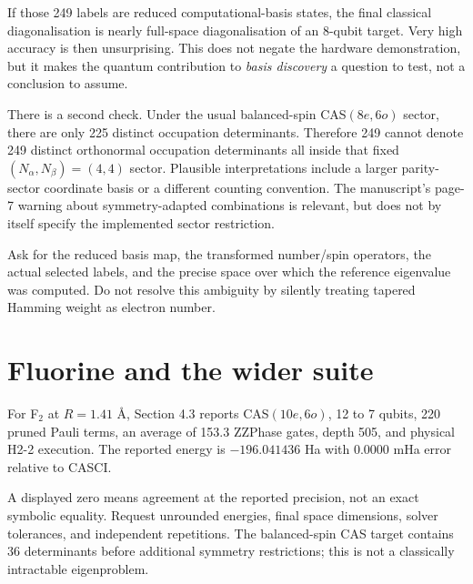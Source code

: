 \documentclass[11pt,a4paper,oneside]{report}
\begin{document}
\begin{idea}
If those 249 labels are reduced computational-basis states, the final classical diagonalisation is nearly full-space diagonalisation of an 8-qubit target. Very high accuracy is then unsurprising. This does not negate the hardware demonstration, but it makes the quantum contribution to \emph{basis discovery} a question to test, not a conclusion to assume.
\end{idea}

There is a second check. Under the usual balanced-spin CAS$(8e,6o)$ sector, there are only 225 distinct occupation determinants. Therefore 249 cannot denote 249 distinct orthonormal occupation determinants all inside that fixed $(N_\alpha,N_\beta)=(4,4)$ sector. Plausible interpretations include a larger parity-sector coordinate basis or a different counting convention. The manuscript's page-7 warning about symmetry-adapted combinations is relevant, but does not by itself specify the implemented sector restriction.

Ask for the reduced basis map, the transformed number/spin operators, the actual selected labels, and the precise space over which the reference eigenvalue was computed. Do not resolve this ambiguity by silently treating tapered Hamming weight as electron number.

\section{Fluorine and the wider suite}
For F$_2$ at $R=1.41$ \AA, Section 4.3 reports CAS$(10e,6o)$, 12 to 7 qubits, 220 pruned Pauli terms, an average of 153.3 ZZPhase gates, depth 505, and physical H2-2 execution. The reported energy is $-196.041436$ Ha with $0.0000$ mHa error relative to CASCI.

A displayed zero means agreement at the reported precision, not an exact symbolic equality. Request unrounded energies, final space dimensions, solver tolerances, and independent repetitions. The balanced-spin CAS target contains 36 determinants before additional symmetry restrictions; this is not a classically intractable eigenproblem.
\end{document}
